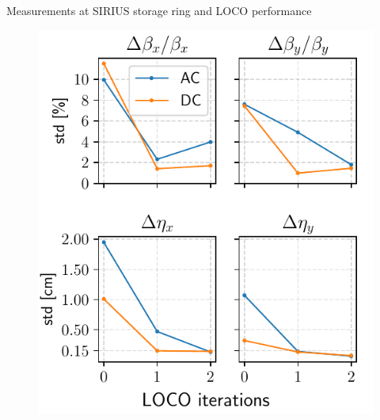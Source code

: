 \documentclass[aspectratio=169]{beamer}
\begin{document}
\begin{frame}{Measurements at SIRIUS storage ring and LOCO performance}
\begin{minipage}{0.49\textwidth}
\begin{figure}
            \includegraphics[width=\textwidth]{MOPOTK002_f5.pdf}
        \end{figure}
    \end{minipage}
\end{frame}
\end{document}

